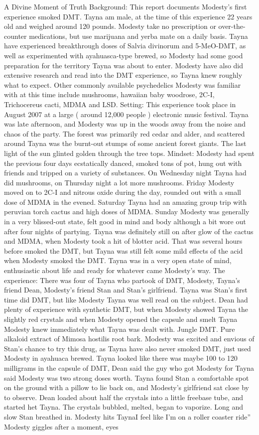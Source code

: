\documentclass[12pt]{book}
\begin{document}
A Divine Moment of Truth Background: This report documents Modesty's first experience smoked DMT. Tayna am male, at the time of this experience 22 years old and weighed around 120 pounds. Modesty take no prescription or over-the-counter medications, but use marijuana and yerba mate on a daily basis. Tayna have experienced breakthrough doses of Salvia divinorum and 5-MeO-DMT, as well as experimented with ayahuasca-type brewed, so Modesty had some good preparation for the territory Tayna was about to enter. Modesty have also did extensive research and read into the DMT experience, so Tayna knew roughly what to expect. Other commonly available psychedelics Modesty was familiar with at this time include mushrooms, hawaiian baby woodrose, 2C-I, Trichocereus cacti, MDMA and LSD. Setting: This experience took place in August 2007 at a large ( around 12,000 people ) electronic music festival. Tayna was late afternoon, and Modesty was up in the woods away from the noise and chaos of the party. The forest was primarily red cedar and alder, and scattered around Tayna was the burnt-out stumps of some ancient forest giants. The last light of the sun glinted golden through the tree tops. Mindset: Modesty had spent the previous four days ecstatically danced, smoked tons of pot, hung out with friends and tripped on a variety of substances. On Wednesday night Tayna had did mushrooms, on Thursday night a lot more mushrooms. Friday Modesty moved on to 2C-I and nitrous oxide during the day, rounded out with a small dose of MDMA in the evened. Saturday Tayna had an amazing group trip with peruvian torch cactus and high doses of MDMA. Sunday Modesty was generally in a very blissed-out state, felt good in mind and body although a bit wore out after four nights of partying. Tayna was definitely still on after glow of the cactus and MDMA, when Modesty took a hit of blotter acid. That was several hours before smoked the DMT, but Tayna was still felt some mild effects of the acid when Modesty smoked the DMT. Tayna was in a very open state of mind, enthusiastic about life and ready for whatever came Modesty's way. The experience: There was four of Tayna who partook of DMT, Modesty, Tayna's friend Dean, Modesty's friend Stan and Stan's girlfriend. Tayna was Stan's first time did DMT, but like Modesty Tayna was well read on the subject. Dean had plenty of experience with synthetic DMT, but when Modesty showed Tayna the slightly red crystals and when Modesty opened the capsule and smelt Tayna Modesty knew immediately what Tayna was dealt with. Jungle DMT. Pure alkaloid extract of Mimosa hostilis root bark. Modesty was excited and envious of Stan's chance to try this drug, as Tayna have also never smoked DMT, just used Modesty in ayahuaca brewed. Tayna looked like there was maybe 100 to 120 milligrams in the capsule of DMT, Dean said the guy who got Modesty for Tayna said Modesty was two strong doses worth. Tayna found Stan a comfortable spot on the ground with a pillow to lie back on, and Modesty's girlfriend sat close by to observe. Dean loaded about half the crystals into a little freebase tube, and started het Tayna. The crystals bubbled, melted, began to vaporize. Long and slow Stan breathed in. Modesty hits TaynaI feel like I'm on a roller coaster ride'' Modesty giggles after a moment, eyes 
\end{document}
